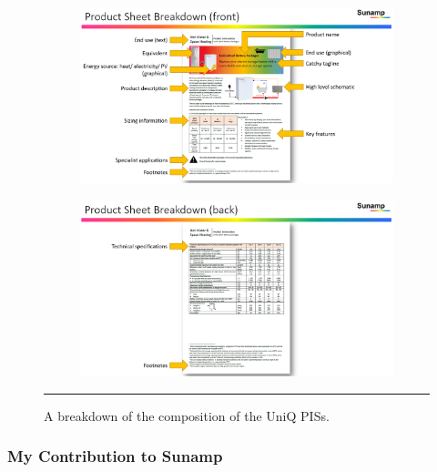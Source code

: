 \begin{figure}[htbp]
	\centering
	\begin{subfigure}{\textwidth}
		\centering
		\includegraphics[width=\textwidth]{figures/PIS_breakdown_01.PNG}
		\label{breakdown01}
	\end{subfigure}
	\begin{subfigure}{\textwidth}
		\centering
		\includegraphics[width=\textwidth]{figures/PIS_breakdown_02.PNG}
		\label{breakdown02}
	\end{subfigure}
	\rule{\textwidth}{0.5pt} %
	\caption{A breakdown of the composition of the UniQ PISs.}
	\label{breakdown}
\end{figure}




\subsubsection{My Contribution to Sunamp}

